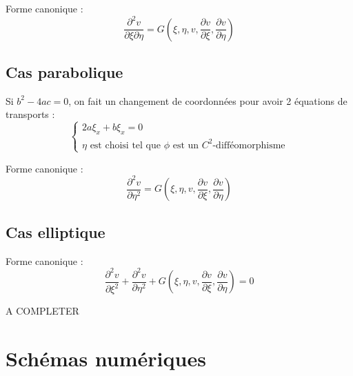 \documentclass[12pt]{report}
\begin{document}
Forme canonique :
$$ \frac{\partial^2 v}{\partial \xi \partial \eta}=G(\xi,\eta,v,
\frac{\partial v}{\partial \xi},\frac{\partial v}{\partial \eta})$$

\subsection{Cas parabolique}
Si $b^2-4ac = 0$, on fait un changement de coordonn\'ees pour avoir 2 \'equations de
transports :
\begin{equation*}
\left\{
\begin{array}{l}
2a \xi_x+ b \xi_x=0\\
\eta \text{ est choisi tel que } \phi \text{ est un } C^2 \text{-diff\'eomorphisme}
\end{array}
\right.
\end{equation*}

Forme canonique :
$$ \frac{\partial^2 v}{\partial \eta^2}=G(\xi,\eta,v,
\frac{\partial v}{\partial \xi},\frac{\partial v}{\partial \eta})$$

\subsection{Cas elliptique}
Forme canonique :
$$ \frac{\partial^2 v}{\partial \xi^2}
+\frac{\partial^2 v}{\partial \eta^2}+G(\xi,\eta,v,
\frac{\partial v}{\partial \xi},\frac{\partial v}{\partial \eta})=0$$

A COMPLETER

\section{Sch\'emas num\'eriques}
\end{document}
